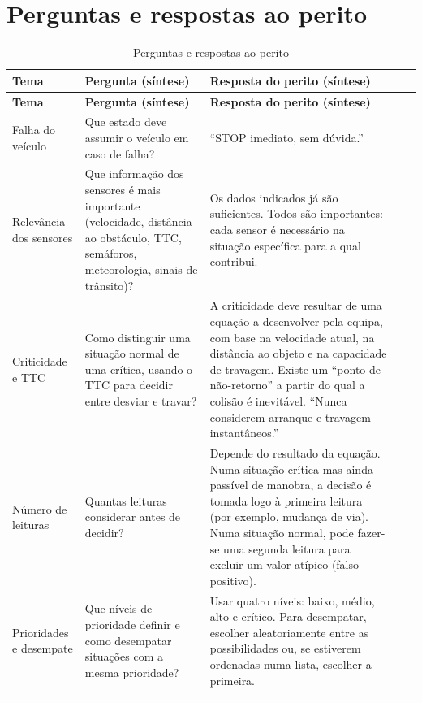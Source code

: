 \chapter{Perguntas e respostas ao perito}
\label{anx:sessoes}

{\footnotesize
\begin{longtable}{@{}L{2.6cm}VL{5.3cm}VL{7.0cm}@{}}
  \caption{Perguntas e respostas ao perito}
  \label{tab:perguntas-perito}\\
  \toprule
  \textbf{Tema} & \textbf{Pergunta (síntese)}
    & \textbf{Resposta do perito (síntese)} \\
  \midrule
  \endfirsthead
  \toprule
  \textbf{Tema} & \textbf{Pergunta (síntese)}
    & \textbf{Resposta do perito (síntese)} \\
  \midrule
  \endhead
  \bottomrule
  \endfoot
  Falha do veículo
    & Que estado deve assumir o veículo em caso de falha?
    & \enquote{STOP imediato, sem dúvida.} \\ \linhasep
  Relevância dos sensores
    & Que informação dos sensores é mais importante (velocidade, distância
      ao obstáculo, TTC, semáforos, meteorologia, sinais de trânsito)?
    & Os dados indicados já são suficientes. Todos são importantes: cada
      sensor é necessário na situação específica para a qual contribui. \\ \linhasep
  Criticidade e TTC
    & Como distinguir uma situação normal de uma crítica, usando o TTC para
      decidir entre desviar e travar?
    & A criticidade deve resultar de uma equação a desenvolver pela equipa,
      com base na velocidade atual, na distância ao objeto e na capacidade de
      travagem. Existe um \enquote{ponto de não-retorno} a partir do qual a colisão é
      inevitável. \enquote{Nunca considerem arranque e travagem instantâneos.} \\ \linhasep
  Número de leituras
    & Quantas leituras considerar antes de decidir?
    & Depende do resultado da equação. Numa situação crítica mas ainda
      passível de manobra, a decisão é tomada logo à primeira leitura (por
      exemplo, mudança de via). Numa situação normal, pode fazer-se uma
      segunda leitura para excluir um valor atípico (falso positivo). \\ \linhasep
  Prioridades e desempate
    & Que níveis de prioridade definir e como desempatar situações com a
      mesma prioridade?
    & Usar quatro níveis: baixo, médio, alto e crítico. Para desempatar,
      escolher aleatoriamente entre as possibilidades ou, se estiverem
      ordenadas numa lista, escolher a primeira. \\ \linhasep

\end{longtable}}
